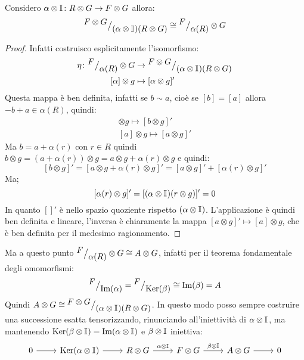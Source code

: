 \begin{osservation}
Considero $ \alpha \otimes \mathbb{I}_{} \colon R \otimes G \to F \otimes G $ allora:
\[
  {^{\textstyle F \otimes G}\big/_{\textstyle (\alpha \otimes \mathbb{I}_{})(R \otimes G)}} \cong {^{\textstyle F}\big/_{\textstyle \alpha(R)}} \otimes G
\]
\end{osservation}
\begin{proof}
Infatti costruisco esplicitamente l'isomorfismo:
\begin{align*}
  \eta \colon {^{\textstyle F}\big/_{\textstyle \alpha(R)}} \otimes G & \to {^{\textstyle F \otimes G}\big/_{\textstyle (\alpha \otimes \mathbb{I}_{})(R \otimes G)}} \\
  [\alpha] \otimes g & \mapsto [\alpha \otimes g]'
\end{align*}
Questa mappa è ben definita, infatti se $ b \sim a $, cioè se $ [b] = [a] $ allora
$ -b + a \in \alpha(R) $, quindi:
\begin{gather*}
  [b] \otimes g \mapsto [b \otimes g]' \\
  [a] \otimes g \mapsto [a \otimes g]'
\end{gather*}
Ma $ b = a + \alpha(r) $ con $ r \in R $ quindi $ b \otimes g = (a + \alpha(r)) \otimes g = a \otimes g + \alpha(r) \otimes g $
e quindi:
\[
  [b \otimes g]' = [a \otimes g + \alpha(r) \otimes g]' = [a \otimes g]' + [\alpha(r) \otimes g]'
\]
Ma;
\[
  [\alpha(r) \otimes g]' = [(\alpha \otimes \mathbb{I}_{})(r \otimes g)]' = 0
\]
In quanto $ []' $ è nello spazio quoziente rispetto $ (\alpha \otimes \mathbb{I}_{}) $.
L'applicazione è quindi ben definita e lineare, l'inversa è chiaramente la
mappa $ [a \otimes g]' \mapsto [a] \otimes g $, che è ben definita per il medesimo ragionamento.
\end{proof}


Ma a questo punto $ {^{\textstyle F}\big/_{\textstyle \alpha(R)}} \otimes G \cong A \otimes G $, infatti per il teorema fondamentale
degli omomorfismi:
\[
  {^{\textstyle F}\big/_{\textstyle \mathrm{Im}( \alpha )}} = {^{\textstyle F}\big/_{\textstyle \mathrm{Ker}( \beta)}} \cong \mathrm{Im}( \beta ) = A
\]
Quindi $ A \otimes G \cong {^{\textstyle F \otimes G}\big/_{\textstyle {(\alpha \otimes \mathbb{I}_{})(R \otimes G)}}} $.
In questo modo posso sempre costruire una successione esatta tensorizzando, rinunciando all'iniettività
di $ \alpha \otimes \mathbb{I}_{} $, ma mantenendo $ \mathrm{Ker}( \beta \otimes \mathbb{I}_{}) = \mathrm{Im}( \alpha \otimes \mathbb{I}_{} ) $ e $ \beta \otimes \mathbb{I}_{} $ iniettiva:
\[
  \begin{tikzcd}
    0 \rar & \ker{\alpha \otimes \Id{}} \rar & R \otimes G \rar{\alpha \otimes \Id{}} & F \otimes G \rar{\beta \otimes \Id{}} & A \otimes G \rar & 0
  \end{tikzcd}
\]

